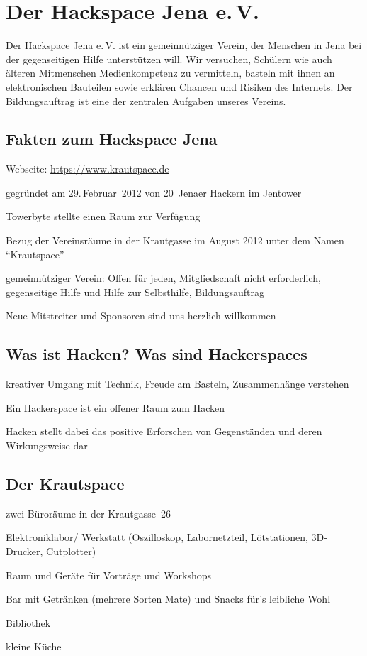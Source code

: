 \documentclass[a4paper,12pt,twoside]{scrartcl}
\begin{document}
\thispagestyle{empty}
\section*{Der Hackspace Jena e.\,V.}
Der Hackspace Jena e.\,V. ist ein gemeinnütziger Verein, der Menschen
in Jena bei der gegenseitigen Hilfe unterstützen will. Wir versuchen,
Schülern wie auch älteren Mitmenschen Medienkompetenz zu vermitteln,
basteln mit ihnen an elektronischen Bauteilen sowie erklären Chancen
und Risiken des Internets. Der Bildungsauftrag ist eine der zentralen
Aufgaben unseres Vereins.

\subsection*{Fakten zum Hackspace Jena}
\begin{compactitem}
\item Webseite: \url{https://www.krautspace.de}
\item gegründet am 29.\,Februar~2012 von 20~Jenaer Hackern im Jentower
\item Towerbyte stellte einen Raum zur Verfügung
\item Bezug der Vereinsräume in der Krautgasse im August 2012 unter
  dem Namen \enquote{Krautspace}
\item gemeinnütziger Verein: Offen für jeden, Mitgliedschaft nicht erforderlich, gegenseitige Hilfe und Hilfe zur Selbsthilfe, Bildungsauftrag
\item Neue Mitstreiter und Sponsoren sind uns herzlich willkommen
\end{compactitem}
\subsection*{Was ist Hacken? Was sind Hackerspaces}
\begin{compactitem}
\item kreativer Umgang mit Technik, Freude am Basteln, Zusammenhänge verstehen
\item Ein Hackerspace ist ein offener Raum zum Hacken
\item Hacken stellt dabei das positive Erforschen von Gegenständen und
  deren Wirkungsweise dar
\end{compactitem}
\subsection*{Der Krautspace}
\begin{compactitem}
\item zwei Büroräume in der Krautgasse~26
\item Elektroniklabor/ Werkstatt (Oszilloskop, Labornetzteil, Lötstationen, 3D-Drucker, Cutplotter)
\item Raum und Geräte für Vorträge und Workshops
\item Bar mit Getränken (mehrere Sorten Mate) und Snacks für's leibliche Wohl
\item Bibliothek
\item kleine Küche
\end{compactitem}
\end{document}
